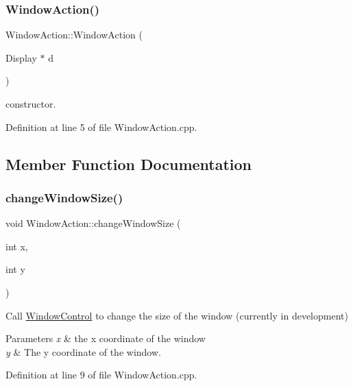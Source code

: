 \subsubsection{\texorpdfstring{Window\+Action()}{WindowAction()}}
{\footnotesize\ttfamily Window\+Action\+::\+Window\+Action (\begin{DoxyParamCaption}\item[{Display $\ast$}]{d }\end{DoxyParamCaption})}

constructor. 

Definition at line 5 of file Window\+Action.\+cpp.



\subsection{Member Function Documentation}
\mbox{\label{class_ubuntu_controller_1_1_window_action_ac7145d79c3b902a716d554d09e6e2a63}} 
\subsubsection{\texorpdfstring{change\+Window\+Size()}{changeWindowSize()}}
{\footnotesize\ttfamily void Window\+Action\+::change\+Window\+Size (\begin{DoxyParamCaption}\item[{int}]{x,  }\item[{int}]{y }\end{DoxyParamCaption})}

Call \hyperlink{class_ubuntu_controller_1_1_window_control}{Window\+Control} to change the size of the window (currently in development)


\begin{DoxyParams}{Parameters}
{\em x} & the x coordinate of the window \\
\hline
{\em y} & The y coordinate of the window. \\
\hline
\end{DoxyParams}


Definition at line 9 of file Window\+Action.\+cpp.

